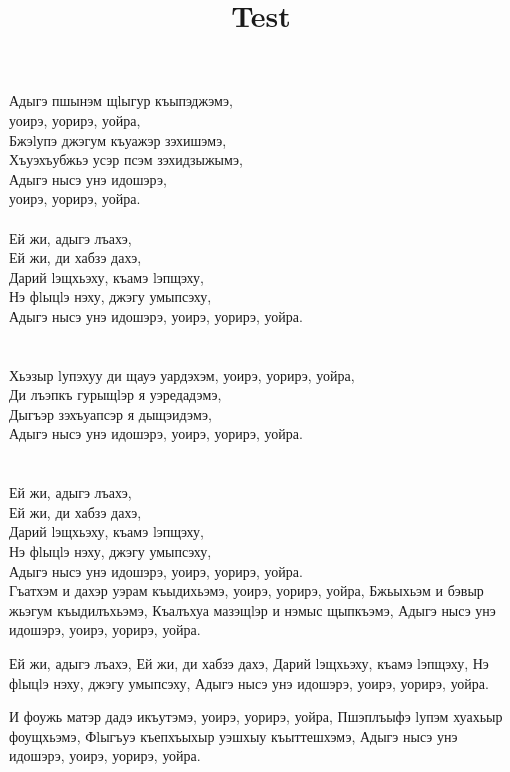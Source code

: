 \documentclass[a4paper,12pt]{book}
\title{Test}
\newcommand{\1}[1]{\textbf{\emph{#1}}} %
\newcommand{\2}[1]{\textbf{[#1]}} %
\newcommand{\3}[1]{\fontsize{11pt}{0cm}\textbf{\emph{#1}}} %
\newcommand{\4}[1]{\fontsize{10pt}{0cm}\emph{#1}}	%
\newcommand{\5}[1]{\textbf{/#1/}} %
\newcommand{\6}[1]{\textbf{[#1]}} %
\newcommand{\7}[1]{\fontsize{12pt}{0cm}\emph{#1}} %
\newcommand{\8}[1]{\fontsize{12pt}{0cm}`#1'} %
\newcommand{\9}[1]{\fontsize{12pt}{0cm}(lit. `#1')} %
\begin{document}
\frontmatter
\maketitle\newpage
\setcounter{secnumdepth}{4}
\setcounter{tocdepth}{4}

\newpage
\mainmatter


Адыгэ пшынэм щlыгур къыпэджэмэ, \\
уоирэ, уорирэ, уойра,\\
Бжэlупэ джэгум къуажэр зэхишэмэ,\\
Хъуэхъубжьэ усэр псэм зэхидзыжымэ,\\
Адыгэ нысэ унэ идошэрэ, \\
уоирэ, уорирэ, уойра.\\
\\
Ей жи, адыгэ лъахэ,\\
Ей жи, ди хабзэ дахэ,\\
Дарий lэщхьэху, къамэ lэпщэху,\\
Нэ фlыцlэ нэху, джэгу умыпсэху,\\
Адыгэ нысэ унэ идошэрэ, уоирэ, уорирэ, уойра.\\
\\\\
Хьэзыр lупэхуу ди щауэ уардэхэм, уоирэ, уорирэ, уойра,\\
Ди лъэпкъ гурыщlэр я уэредадэмэ,\\
Дыгъэр зэхъуапсэр я дыщэидэмэ,\\
Адыгэ нысэ унэ идошэрэ, уоирэ, уорирэ, уойра.\\
\\\\
Ей жи, адыгэ лъахэ,\\
Ей жи, ди хабзэ дахэ,\\
Дарий lэщхьэху, къамэ lэпщэху,\\
Нэ фlыцlэ нэху, джэгу умыпсэху,\\
Адыгэ нысэ унэ идошэрэ, уоирэ, уорирэ, уойра.\\

Гъатхэм и дахэр уэрам къыдихьэмэ, уоирэ, уорирэ, уойра,
Бжьыхьэм и бэвыр жьэгум къыдилъхьэмэ,
Къалъхуа мазэщlэр и нэмыс щыпкъэмэ,
Адыгэ нысэ унэ идошэрэ, уоирэ, уорирэ, уойра.

Ей жи, адыгэ лъахэ,
Ей жи, ди хабзэ дахэ,
Дарий lэщхьэху, къамэ lэпщэху,
Нэ фlыцlэ нэху, джэгу умыпсэху,
Адыгэ нысэ унэ идошэрэ, уоирэ, уорирэ, уойра.

И фоужь матэр дадэ икъутэмэ, уоирэ, уорирэ, уойра,
Пшэплъыфэ lупэм хуахьыр фоущхьэмэ,
Фlыгъуэ къепхъыхыр уэшхыу къыттешхэмэ,
Адыгэ нысэ унэ идошэрэ, уоирэ, уорирэ, уойра.
\end{document}

